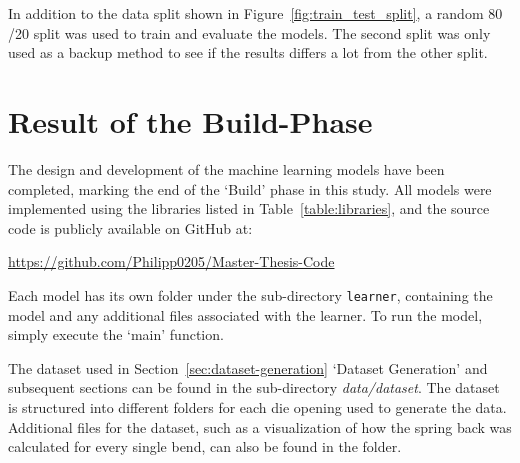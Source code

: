In addition to the data split shown in Figure~\ref{fig:train_test_split}, a random 80
/20 split was used to train and evaluate the models.
The second split was only used as a backup method to see if the results differs a lot from the other split.


\section{Result of the Build-Phase}\label{sec:results-build-phase}

The design and development of the machine learning models have been completed, marking the end of the `Build' phase
in this study. All models were implemented using the libraries listed in Table~\ref{table:libraries}, and the source
code is publicly available on GitHub at:

\url{https://github.com/Philipp0205/Master-Thesis-Code}

Each model has its own folder under the sub-directory \texttt{learner}, containing the model and any additional files
associated with the learner. To run the model, simply execute the `main' function.

The dataset used in Section~\ref{sec:dataset-generation} `Dataset Generation' and subsequent sections can be found in
the sub-directory \textit{data/dataset}. The dataset is structured into different folders for each die opening used
to generate the data. Additional files for the dataset, such as a visualization of how the spring back was calculated
for every single bend, can also be found in the folder.